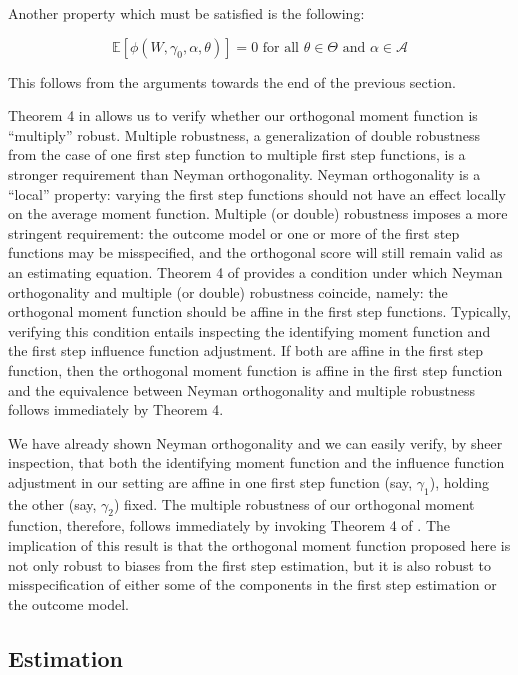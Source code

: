 Another property which must be satisfied is the following: 

\[
\mathbb{E}\left[\phi\left(W, \gamma_0, \alpha, \theta\right)\right]=0 \text { for all } \theta \in \Theta \text { and } \alpha \in \mathcal{A}
\]

This follows from the arguments towards the end of the previous section.

Theorem 4 in \citet{chernozhukov2022locally} allows us to verify whether our orthogonal moment function is \enquote{multiply} robust. Multiple robustness, a generalization of double robustness from the case of one first step function to multiple first step functions, is a stronger requirement than Neyman orthogonality. Neyman orthogonality is a \enquote{local} property: varying the first step functions should not have an effect locally on the average moment function. Multiple (or double) robustness imposes a more stringent requirement: the outcome model or one or more of the first step functions may be misspecified, and the orthogonal score will still remain valid as an estimating equation. Theorem 4 of \citet{chernozhukov2022locally} provides a condition under which Neyman orthogonality and multiple (or double) robustness coincide, namely: the orthogonal moment function should be affine in the first step functions. Typically, verifying this condition entails inspecting the identifying moment function and the first step influence function adjustment. If both are affine in the first step function, then the orthogonal moment function is affine in the first step function and the equivalence between Neyman orthogonality and multiple robustness follows immediately by Theorem 4. 

We have already shown Neyman orthogonality and we can easily verify, by sheer inspection,  that both the identifying moment function and the influence function adjustment in our setting are affine in one first step function (say, $\gamma_1$), holding the other (say, $\gamma_2$) fixed. The multiple robustness of our orthogonal moment function, therefore, follows immediately by invoking Theorem 4 of \citet{chernozhukov2022locally}. The implication of this result is that the orthogonal moment function proposed here is not only robust to biases from the first step estimation, but it is also robust to misspecification of either some of the components in the first step estimation or the outcome model.

\subsection{Estimation}

